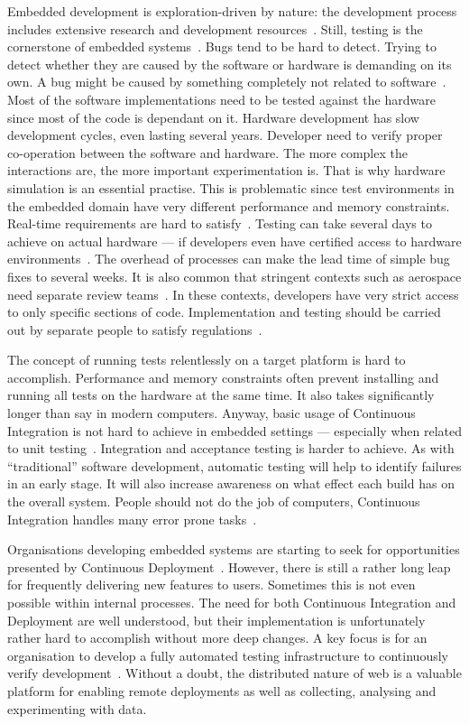 \documentclass[english]{tktltiki2}
\begin{document}
Embedded development is exploration-driven by nature: the development process includes extensive research and development resources~\cite{EHS14}. Still, testing is the cornerstone of embedded systems~\cite{RA03, HAB12, KRM13, EHS14, Ngy15}. Bugs tend to be hard to detect. Trying to detect whether they are caused by the software or hardware is demanding on its own. A bug might be caused by something completely not related to software~\cite{Ngy15}. Most of the software implementations need to be tested against the hardware since most of the code is dependant on it. Hardware development has slow development cycles, even lasting several years. Developer need to verify proper co-operation between the software and hardware. The more complex the interactions are, the more important experimentation is. That is why hardware simulation is an essential practise. This is problematic since test environments in the embedded domain have very different performance and memory constraints. Real-time requirements are hard to satisfy~\cite{RA03, HMP12}. Testing can take several days to achieve on actual hardware — if developers even have certified access to hardware environments~\cite{VB09}. The overhead of processes can make the lead time of simple bug fixes to several weeks. It is also common that stringent contexts such as aerospace need separate review teams~\cite{VB09}. In these contexts, developers have very strict access to only specific sections of code. Implementation and testing should be carried out by separate people to satisfy regulations~\cite{VB09, JLP12}.

The concept of running tests relentlessly on a target platform is hard to accomplish. Performance and memory constraints often prevent installing and running all tests on the hardware at the same time. It also takes significantly longer than say in modern computers. Anyway, basic usage of Continuous Integration is not hard to achieve in embedded settings — especially when related to unit testing~\cite{RA03, KRM13}. Integration and acceptance testing is harder to achieve. As with “traditional” software development, automatic testing will help to identify failures in an early stage. It will also increase awareness on what effect each build has on the overall system. People should not do the job of computers, Continuous Integration handles many error prone tasks~\cite{Ngy15}.

Organisations developing embedded systems are starting to seek for opportunities presented by Continuous Deployment~\cite{HAB12}. However, there is still a rather long leap for frequently delivering new features to users. Sometimes this is not even possible within internal processes. The need for both Continuous Integration and Deployment are well understood, but their implementation is unfortunately rather hard to accomplish without more deep changes. A key focus is for an organisation to develop a fully automated testing infrastructure to continuously verify development~\cite{HAB12}. Without a doubt, the distributed nature of web is a valuable platform for enabling remote deployments as well as collecting, analysing and experimenting with data.
\end{document}

